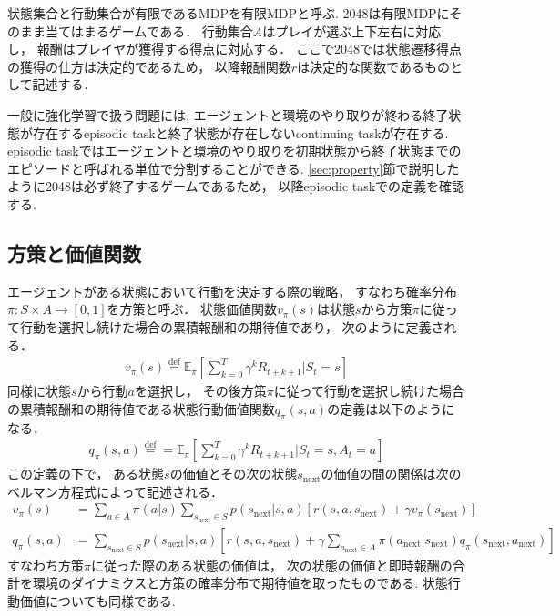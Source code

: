 状態集合と行動集合が有限であるMDPを有限MDPと呼ぶ.
2048は有限MDPにそのまま当てはまるゲームである．
行動集合\textit{A}はプレイが選ぶ上下左右に対応し， 報酬はプレイヤが獲得する得点に対応する．
ここで2048では状態遷移得点の獲得の仕方は決定的であるため， 以降報酬関数$r$は決定的な関数であるものとして記述する．

一般に強化学習で扱う問題には, エージェントと環境のやり取りが終わる終了状態が存在するepisodic taskと終了状態が存在しないcontinuing taskが存在する. 
episodic taskではエージェントと環境のやり取りを初期状態から終了状態までのエピソードと呼ばれる単位で分割することができる.
\ref{sec:property}節で説明したように2048は必ず終了するゲームであるため， 以降episodic taskでの定義を確認する. 

\subsection{方策と価値関数}
エージェントがある状態において行動を決定する際の戦略， すなわち確率分布$\pi:S \times A \rightarrow [0,1]$を方策と呼ぶ．
状態価値関数$v_{\pi}(s)$は状態$s$から方策$\pi$に従って行動を選択し続けた場合の累積報酬和の期待値であり， 次のように定義される．
\begin{align}
  v_{\pi}(s) \stackrel{\mathrm{def}}{=} \mathbb{E}_{\pi}\left[\sum_{k=0}^T \gamma^k R_{t+k+1}|S_t=s \right]
\end{align}
同様に状態$s$から行動$a$を選択し， その後方策$\pi$に従って行動を選択し続けた場合の累積報酬和の期待値である状態行動価値関数$q_{\pi}(s,a)$の定義は以下のようになる．
\begin{align}
  q_{\pi}(s,a) \stackrel{\mathrm{def}}{=} = \mathbb{E}_{\pi}\left[\sum_{k=0}^T \gamma^k R_{t+k+1}|S_t=s, A_t=a \right]
\end{align}
この定義の下で， ある状態$s$の価値とその次の状態$s_{\text{next}}$の価値の間の関係は次のベルマン方程式によって記述される．
\begin{align}
  v_{\pi}(s) &= \sum_{a \in A} \pi(a|s) \sum_{s_{\text{next}} \in S} p(s_{\text{next}}|s,a)[r(s,a,s_{\text{next}}) + \gamma v_{\pi}(s_{\text{next}})] \\
  q_{\pi}(s,a) &= \sum_{s_{\text{next}} \in S} p(s_{\text{next}}|s,a)\left[r(s,a,s_{\text{next}}) + \gamma \sum_{a_{\text{next}} \in A} \pi(a_{\text{next}}|s_{\text{next}})q_{\pi}(s_{\text{next}}, a_{\text{next}})\right]
\end{align}
すなわち方策$\pi$に従った際のある状態の価値は， 次の状態の価値と即時報酬の合計を環境のダイナミクスと方策の確率分布で期待値を取ったものである. 
状態行動価値についても同様である.

